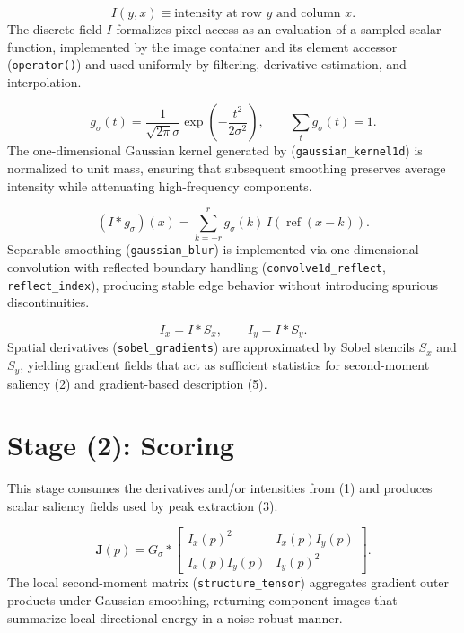 \documentclass[11pt]{article}
\begin{document}
\begin{equation}
I(y,x)\equiv \text{intensity at row }y\text{ and column }x .
\end{equation}
The discrete field $I$ formalizes pixel access as an evaluation of a sampled scalar function, implemented by the image container and its element accessor (\texttt{operator()}) and used uniformly by filtering, derivative estimation, and interpolation.

\begin{equation}
g_{\sigma}(t)=\frac{1}{\sqrt{2\pi}\sigma}\exp\!\left(-\frac{t^{2}}{2\sigma^{2}}\right),\qquad \sum_{t} g_{\sigma}(t)=1 .
\end{equation}
The one-dimensional Gaussian kernel generated by (\texttt{gaussian\_kernel1d}) is normalized to unit mass, ensuring that subsequent smoothing preserves average intensity while attenuating high-frequency components.

\begin{equation}
(I*g_{\sigma})(x)=\sum_{k=-r}^{r} g_{\sigma}(k)\, I(\operatorname{ref}(x-k)).
\end{equation}
Separable smoothing (\texttt{gaussian\_blur}) is implemented via one-dimensional convolution with reflected boundary handling (\texttt{convolve1d\_reflect}, \texttt{reflect\_index}), producing stable edge behavior without introducing spurious discontinuities.

\begin{equation}
I_{x}=I*S_{x},\qquad I_{y}=I*S_{y}.
\end{equation}
Spatial derivatives (\texttt{sobel\_gradients}) are approximated by Sobel stencils $S_x$ and $S_y$, yielding gradient fields that act as sufficient statistics for second-moment saliency (2) and gradient-based description (5).

\section*{Stage (2): Scoring}
This stage consumes the derivatives and/or intensities from (1) and produces scalar saliency fields used by peak extraction (3).

\begin{equation}
\mathbf{J}(p)=G_{\sigma}*\begin{bmatrix}
I_{x}(p)^{2} & I_{x}(p)I_{y}(p)\\
I_{x}(p)I_{y}(p) & I_{y}(p)^{2}
\end{bmatrix}.
\end{equation}
The local second-moment matrix (\texttt{structure\_tensor}) aggregates gradient outer products under Gaussian smoothing, returning component images that summarize local directional energy in a noise-robust manner.
\end{document}

